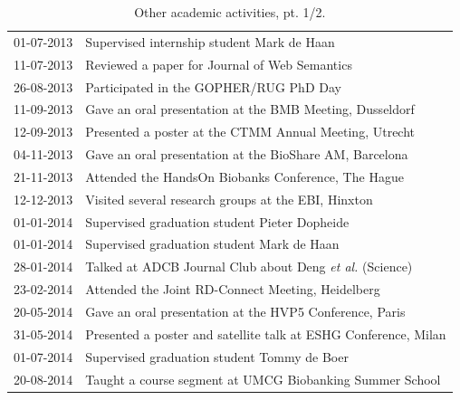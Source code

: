 \begin{appendices}
\begin{table}
\begin{tabulary}{\linewidth}{LL}
  \rule{0pt}{2.5ex}\mbox{01-07-2013} & Supervised internship student Mark de Haan \\
  \rule{0pt}{2.5ex}\mbox{11-07-2013} & Reviewed a paper for Journal of Web Semantics \\
  \rule{0pt}{2.5ex}\mbox{26-08-2013} & Participated in the GOPHER/RUG PhD Day \\
  \rule{0pt}{2.5ex}\mbox{11-09-2013} & Gave an oral presentation at the BMB Meeting, Dusseldorf \\
  \rule{0pt}{2.5ex}\mbox{12-09-2013} & Presented a poster at the CTMM Annual Meeting, Utrecht \\
  \rule{0pt}{2.5ex}\mbox{04-11-2013} & Gave an oral presentation at the BioShare AM, Barcelona \\
  \rule{0pt}{2.5ex}\mbox{21-11-2013} & Attended the HandsOn Biobanks Conference, The Hague\\
  \rule{0pt}{2.5ex}\mbox{12-12-2013} & Visited several research groups at the EBI, Hinxton \\
  \rule{0pt}{2.5ex}\mbox{01-01-2014} & Supervised graduation student Pieter Dopheide \\
  \rule{0pt}{2.5ex}\mbox{01-01-2014} & Supervised graduation student Mark de Haan \\
  \rule{0pt}{2.5ex}\mbox{28-01-2014} & Talked at ADCB Journal Club about Deng \textsl{et al.} (Science) \\
  \rule{0pt}{2.5ex}\mbox{23-02-2014} & Attended the Joint RD-Connect Meeting, Heidelberg \\
  \rule{0pt}{2.5ex}\mbox{20-05-2014} & Gave an oral presentation at the HVP5 Conference, Paris \\
  \rule{0pt}{2.5ex}\mbox{31-05-2014} & Presented a poster and satellite talk at ESHG Conference, Milan \\
  \rule{0pt}{2.5ex}\mbox{01-07-2014} & Supervised graduation student Tommy de Boer \\
  \rule{0pt}{2.5ex}\mbox{20-08-2014} & Taught a course segment at UMCG Biobanking Summer School \\
  \hline
\end{tabulary}
\caption[Other academic activities, pt. 1/2]{Other academic activities, pt. 1/2.}
\label{table:appendix_activities_1}
\end{table}


\end{appendices}
